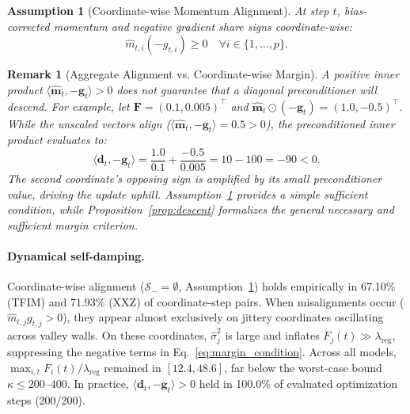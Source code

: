 \documentclass[11pt,a4paper]{article}
\newtheorem{assumption}{Assumption}
\newtheorem{remark}{Remark}
\begin{document}
\begin{assumption}[Coordinate-wise Momentum Alignment]
\label{ass:alignment}
At step $t$, bias-corrected momentum and negative gradient share signs coordinate-wise:
\begin{equation}
\hat{m}_{t,i} (-g_{t,i}) \ge 0 \quad \forall i \in \{1, \dots, p\}.
\end{equation}
\end{assumption}

\begin{remark}[Aggregate Alignment vs. Coordinate-wise Margin]
\label{rem:alignment_margin}
A positive inner product $\langle \hat{\mathbf{m}}_t, -\mathbf{g}_t \rangle > 0$ does not guarantee that a diagonal preconditioner will descend. For example, let $\mathbf{F} = (0.1, 0.005)^\top$ and $\hat{\mathbf{m}}_t \odot (-\mathbf{g}_t) = (1.0, -0.5)^\top$. While the unscaled vectors align ($\langle \hat{\mathbf{m}}_t, -\mathbf{g}_t \rangle = 0.5 > 0$), the preconditioned inner product evaluates to:
\[
\langle \mathbf{d}_t, -\mathbf{g}_t \rangle = \frac{1.0}{0.1} + \frac{-0.5}{0.005} = 10 - 100 = -90 < 0.
\]
The second coordinate's opposing sign is amplified by its small preconditioner value, driving the update uphill. Assumption~\ref{ass:alignment} provides a simple sufficient condition, while Proposition~\ref{prop:descent} formalizes the general necessary and sufficient margin criterion.
\end{remark}

\paragraph{Dynamical self-damping.}
Coordinate-wise alignment ($\mathcal{S}_- = \emptyset$, Assumption~\ref{ass:alignment}) holds empirically in 67.10\% (TFIM) and 71.93\% (XXZ) of coordinate-step pairs. When misalignments occur ($\hat{m}_{t,j} g_{t,j} > 0$), they appear almost exclusively on jittery coordinates oscillating across valley walls. On these coordinates, $\hat{\sigma}_j^2$ is large and inflates $F_j(t) \gg \lambda_{\text{reg}}$, suppressing the negative terms in Eq.~\eqref{eq:margin_condition}. Across all models, $\max_{i,t} F_i(t)/\lambda_{\text{reg}}$ remained in $[12.4, 48.6]$, far below the worst-case bound $\kappa \le 200$--$400$. In practice, $\langle \mathbf{d}_t, -\mathbf{g}_t \rangle > 0$ held in 100.0\% of evaluated optimization steps (200/200).
\end{document}
